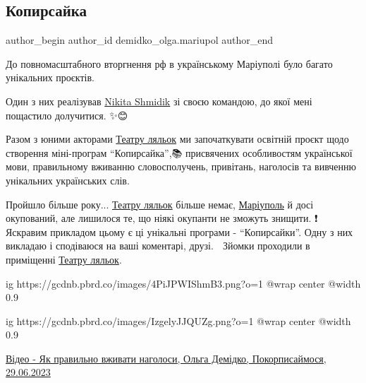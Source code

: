  
 
 
 
 

\subsection{Копирсайка}
\label{sec:29_06_2023.fb.demidko_olga.mariupol.1.kopirsajka}

\ifcmt
 author_begin
   author_id demidko_olga.mariupol
 author_end
\fi

До повномасштабного вторгнення рф в українському Маріуполі було багато унікальних проєктів.  

Один з них реалізував \href{https://www.facebook.com/nikita.shmidik}{Nikita
Shmidik} зі своєю командою, до якої мені пощастило долучитися. ✨️😊


Разом з юними акторами \href{\urlTeatrKukolMariupolIA}{Театру ляльок} ми започаткувати  освітній проєкт щодо
створення міні-програм \enquote{Копирсайка},📚 присвячених особливостям української
мови, правильному вживанню словосполучень, привітань, наголосів та вивченню
унікальних українських слів. 

Пройшло більше року... \href{\urlTeatrKukolMariupolIA}{Театру ляльок} більше немає, \href{\urlMariupolIA}{Маріуполь} й досі окупований,
але лишилося те, що ніякі окупанти не зможуть знищити. ❗️ Яскравим прикладом
цьому є ці унікальні програми - \enquote{Копирсайки}. Одну з них викладаю і сподіваюся
на ваші коментарі, друзі. 🙏 Зйомки проходили в приміщенні \href{\urlTeatrKukolMariupolIA}{Театру ляльок}.

\ifcmt
  ig https://gcdnb.pbrd.co/images/4PiJPWIShmB3.png?o=1
  @wrap center
  @width 0.9
\fi

\ifcmt
  ig https://gcdnb.pbrd.co/images/IzgelyJJQUZg.png?o=1
  @wrap center
  @width 0.9
\fi

\href{https://archive.org/details/video.29_06_2023.olga_demidko.pokopyrsajmosja.jak_pravylno_vzhyvaty_nagolosy}{%
Відео - Як правильно вживати наголоси, Ольга Демідко, Покорписаймося, 29.06.2023%
}


